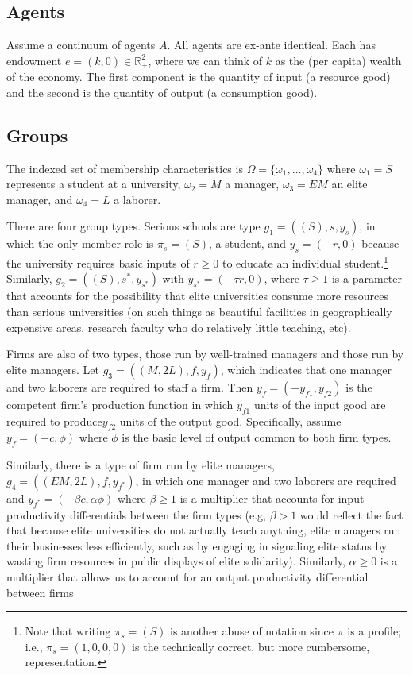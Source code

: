 \documentclass[12pt,letterpaper]{article}
\begin{document}
	\subsection{Agents}
	Assume a continuum of agents $A$. 
	All agents are ex-ante identical. 
	Each has endowment $e=(k,0)\in\mathbb{R}^2_+$, where we can think of $k$ as the (per capita) wealth of the economy.
	The first component is the quantity of input (a resource good) and the second is the quantity of output (a consumption good).
	
	\subsection{Groups}
	The indexed set of membership characteristics is  $\Omega=\{\omega_1,\ldots,\omega_4\}$ where  $\omega_1=S$ represents a student at a university, $\omega_2=M$ a manager, $\omega_3=EM$ an elite manager, and $\omega_4=L$ a laborer.
	
	There are four group types. 
	Serious schools are type $g_1=((S),s,y_s)$, in which the only member role is $\pi_s=(S)$, a student, and $y_s=(-r,0)$ because the university requires basic inputs of $r\ge 0$ to educate an individual student.\footnote
	{
		Note that writing $\pi_s=(S)$ is another abuse of notation since $\pi$ is a profile; i.e., $\pi_s=(1,0,0,0)$ is the technically correct, but more cumbersome, representation.
	}
	Similarly, $g_2=((S),s^\ast,y_{s^\ast})$ with  $y_{s^\ast}=(- \tau  r,0)$, where $\tau\ge 1$ is a parameter that accounts for the possibility that elite universities consume more resources than serious universities (on such things as beautiful facilities in geographically expensive areas, research faculty who do relatively little teaching, etc).
	
	Firms are also of two types, those run by well-trained managers and those run by elite managers.
	Let $g_3=((M,2L),f,y_f)$, which indicates that one manager and two laborers are required to staff a firm.
	Then $y_f=(-y_{f1},y_{f2})$ is the competent firm's production function in which $y_{f1}$ units of the input good are required to produce$y_{f2}$ units of the output good.
	Specifically, assume $y_f=(-c,\phi)$ where $\phi$ is the basic level of output common to both firm types.
	
	Similarly, there is a type of firm run by elite managers,   $g_4=((EM,2L),f,y_{f^\ast})$, in which one manager and two laborers are required and $y_{f^\ast}=(- \beta c,\alpha\phi)$ where $\beta\ge 1$ is a multiplier that accounts for input productivity differentials between the firm types (e.g, $\beta>1$ would reflect the fact that because elite universities do not actually teach anything, elite managers run their businesses less efficiently, such as by engaging in  signaling elite status by wasting firm resources in public displays of elite solidarity).
	Similarly,   $\alpha\ge 0$ is a multiplier that allows us to account for an output productivity differential between firms
	
\end{document}
